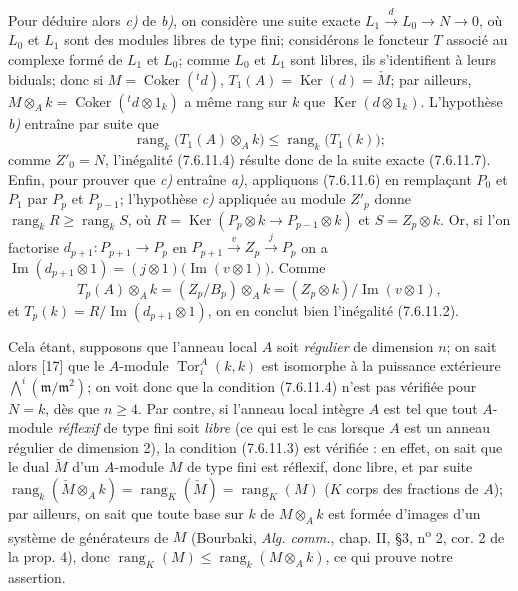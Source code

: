 \begin{remark}[7.6.11]
Pour déduire alors \emph{c)} de \emph{b)}, on considère une suite exacte
$L_1\xrightarrow{d}L_0\longrightarrow N\longrightarrow0$,
où $L_0$ et $L_1$ sont des modules libres de type fini; considérons le foncteur
$T$ associé au complexe formé de $L_1$ et $L_0$; comme $L_0$ et $L_1$ sont
libres, ils s'identifient à leurs biduals; donc si
$M=\operatorname{Coker}({}^t d)$, $T_1(A)=\operatorname{Ker}(d)=\check M$;
par ailleurs, $M\otimes_A k=\operatorname{Coker}({}^t d\otimes1_k)$ a même rang
sur $k$ que $\operatorname{Ker}(d\otimes1_k)$. L'hypothèse \emph{b)} entraîne par suite
que
\[
  \operatorname{rang}_k\bigl(T_1(A)\otimes_A k\bigr)
  \leq
  \operatorname{rang}_k\bigl(T_1(k)\bigr);
\]
comme $Z'_0=N$, l'inégalité (7.6.11.4) résulte donc de la suite exacte
(7.6.11.7).
Enfin, pour prouver que \emph{c)} entraîne \emph{a)}, appliquons (7.6.11.6) en remplaçant
$P_0$ et $P_1$ par $P_p$ et $P_{p-1}$; l'hypothèse \emph{c)} appliquée au module
$Z'_p$ donne $\operatorname{rang}_kR\geq\operatorname{rang}_kS$, où
$R=\operatorname{Ker}(P_p\otimes k\longrightarrow P_{p-1}\otimes k)$ et $S=Z_p\otimes k$.
Or, si l'on factorise $d_{p+1}:P_{p+1}\to P_p$ en
$P_{p+1}\xrightarrow{v}Z_p\xrightarrow{j}P_p$
on a
$\operatorname{Im}(d_{p+1}\otimes1)=(j\otimes1)\bigl(\operatorname{Im}(v\otimes1)\bigr)$.
Comme
\[
  T_p(A)\otimes_A k
  =(Z_p/B_p)\otimes_A k
  =(Z_p\otimes k)/\operatorname{Im}(v\otimes1),
\]
et
$T_p(k)=R/\operatorname{Im}(d_{p+1}\otimes1)$,
on en conclut bien l'inégalité (7.6.11.2).

Cela étant, supposons que l'anneau local $A$ soit \emph{régulier} de dimension $n$;
on sait alors [17] que le $A$-module
$\operatorname{Tor}_i^A(k,k)$ est isomorphe à la puissance extérieure
$\bigwedge\nolimits^i(\mathfrak m/\mathfrak m^2)$;
on voit donc que la condition (7.6.11.4) n'est pas vérifiée pour $N=k$, dès que
$n\geq4$.
Par contre, si l'anneau local intègre $A$ est tel que tout $A$-module \emph{réflexif}
de type fini soit \emph{libre} (ce qui est le cas lorsque $A$ est un anneau régulier
de dimension 2), la condition (7.6.11.3) est vérifiée : en effet, on sait que le
dual $\check M$ d'un $A$-module $M$ de type fini est réflexif, donc libre, et
par suite
$\operatorname{rang}_k(\check M\otimes_A k)=\operatorname{rang}_K(\check M)=\operatorname{rang}_K(M)$
($K$ corps des fractions de $A$); par ailleurs, on sait que toute base sur $k$
de $M\otimes_A k$ est formée d'images d'un système de générateurs de $M$
(Bourbaki, \emph{Alg. comm.}, chap. II, \S 3, n\textsuperscript{o} 2, cor. 2 de
la prop. 4), donc
$\operatorname{rang}_K(M)\leq\operatorname{rang}_k(M\otimes_A k)$, ce qui
prouve notre assertion.
\end{remark}

